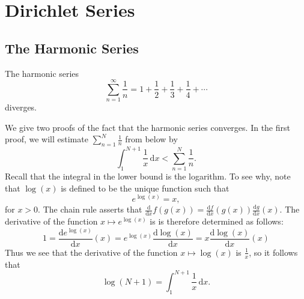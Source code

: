 \chapter{Dirichlet Series}

\section{The Harmonic Series}

\begin{theorem}
  The harmonic series
  \begin{equation*}
    \sum_{n=1}^{\infty}\frac{1}{n}=1+\frac{1}{2}+\frac{1}{3}+\frac{1}{4}+\cdots
  \end{equation*}
  diverges.
\end{theorem}

We give two proofs of the fact that the harmonic series converges. In the first proof, we will estimate $\sum_{n=1}^N\frac{1}{n}$ from below by
\begin{equation*}
  \int_{1}^{N+1}\frac{1}{x}\,\mathrm{d}x<\sum_{n=1}^{N}\frac{1}{n}.
\end{equation*}
Recall that the integral in the lower bound is the logarithm. To see why, note that $\log(x)$ is defined to be the unique function such that
\begin{equation*}
  e^{\log(x)}=x,
\end{equation*}
for $x>0$. The chain rule asserts that $\frac{\mathrm{d}}{\mathrm{d}x}f(g(x))=\frac{\mathrm{d}f}{\mathrm{d}x}(g(x))\frac{\mathrm{d}g}{\mathrm{d}x}(x)$. The derivative of the function $x\mapsto e^{\log(x)}$ is is therefore determined as follows:
\begin{equation*}
  1=\frac{\mathrm{d}e^{\log(x)}}{\mathrm{d}x}(x)=e^{\log(x)}\frac{\mathrm{d}\log(x)}{\mathrm{d}x}=x\frac{\mathrm{d}\log(x)}{\mathrm{d}x}(x)
\end{equation*}
Thus we see that the derivative of the function $x\mapsto \log(x)$ is $\frac{1}{x}$, so it follows that
\begin{equation*}
  \log(N+1)=\int_1^{N+1}\frac{1}{x}\,\mathrm{d}x.
\end{equation*}

